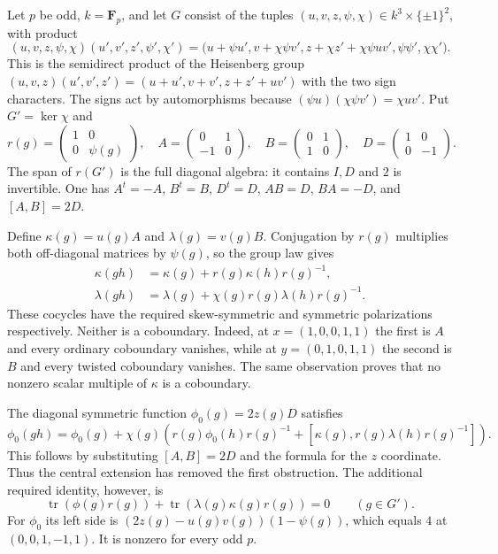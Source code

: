\documentclass[11pt,a4paper]{article}
\theoremstyle{remark}
\begin{document}
Let $p$ be odd, $k=\mathbf F_p$, and let $G$ consist of the tuples
$(u,v,z,\psi,\chi)\in k^3\times\{\pm1\}^2$, with product
\[
 (u,v,z,\psi,\chi)(u',v',z',\psi',\chi')
 =\bigl(u+\psi u',v+\chi\psi v',
 z+\chi z'+\chi\psi uv',\psi\psi',\chi\chi'\bigr).
\]
This is the semidirect product of the Heisenberg group
$(u,v,z)(u',v',z')=(u+u',v+v',z+z'+uv')$ with the two sign
characters. The signs act by automorphisms because
$(\psi u)(\chi\psi v')=\chi uv'$.
Put $G'=\ker\chi$ and
\[
 r(g)=\begin{pmatrix}1&0\\0&\psi(g)\end{pmatrix},\quad
 A=\begin{pmatrix}0&1\\-1&0\end{pmatrix},\quad
 B=\begin{pmatrix}0&1\\1&0\end{pmatrix},\quad
 D=\begin{pmatrix}1&0\\0&-1\end{pmatrix}.
\]
The span of $r(G')$ is the full diagonal algebra: it contains $I,D$
and $2$ is invertible. One has $A^t=-A$, $B^t=B$, $D^t=D$,
$AB=D$, $BA=-D$, and $[A,B]=2D$.

Define $\kappa(g)=u(g)A$ and $\lambda(g)=v(g)B$.
Conjugation by $r(g)$ multiplies both off-diagonal matrices by
$\psi(g)$, so the group law gives
\begin{align*}
 \kappa(gh)&=\kappa(g)+r(g)\kappa(h)r(g)^{-1},\\
 \lambda(gh)&=\lambda(g)+\chi(g)r(g)\lambda(h)r(g)^{-1}.
\end{align*}
These cocycles have the required skew-symmetric and symmetric
polarizations respectively. Neither is a coboundary. Indeed, at
$x=(1,0,0,1,1)$ the first is $A$ and every ordinary coboundary
vanishes, while at $y=(0,1,0,1,1)$ the second is $B$ and every
twisted coboundary vanishes. The same observation proves that
no nonzero scalar multiple of $\kappa$ is a coboundary.

The diagonal symmetric function $\phi_0(g)=2z(g)D$ satisfies
\begin{equation}\label{eq:heisenberg-inhom}
 \phi_0(gh)=\phi_0(g)+\chi(g)
 \left(r(g)\phi_0(h)r(g)^{-1}
       +[\kappa(g),r(g)\lambda(h)r(g)^{-1}]\right).
\end{equation}
This follows by substituting $[A,B]=2D$ and the formula for the
$z$ coordinate. Thus the central extension has removed the first
obstruction. The additional required identity, however, is
\begin{equation}\label{eq:heisenberg-trace}
 \operatorname{tr}(\phi(g)r(g))+
 \operatorname{tr}(\lambda(g)\kappa(g)r(g))=0
                         \qquad(g\in G').
\end{equation}
For $\phi_0$ its left side is
$(2z(g)-u(g)v(g))(1-\psi(g))$, which equals $4$ at
$(0,0,1,-1,1)$. It is nonzero for every odd $p$.
\end{document}
